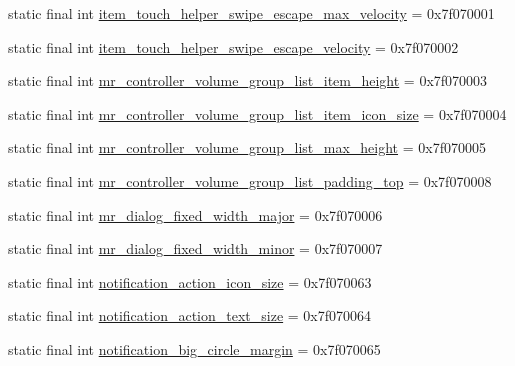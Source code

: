 \begin{CompactItemize}
\item 
static final int \hyperlink{classandroid_1_1support_1_1graphics_1_1drawable_1_1_r_1_1dimen_fcfa127e66b2338009ea298277b85d69}{item\_\-touch\_\-helper\_\-swipe\_\-escape\_\-max\_\-velocity} = 0x7f070001
\item 
static final int \hyperlink{classandroid_1_1support_1_1graphics_1_1drawable_1_1_r_1_1dimen_8df428d4057f24f87acdb506428de57d}{item\_\-touch\_\-helper\_\-swipe\_\-escape\_\-velocity} = 0x7f070002
\item 
static final int \hyperlink{classandroid_1_1support_1_1graphics_1_1drawable_1_1_r_1_1dimen_66c35ff22e7f7a9de2da63670c5d3574}{mr\_\-controller\_\-volume\_\-group\_\-list\_\-item\_\-height} = 0x7f070003
\item 
static final int \hyperlink{classandroid_1_1support_1_1graphics_1_1drawable_1_1_r_1_1dimen_02ea36fce0a33125712616ed9b9ff443}{mr\_\-controller\_\-volume\_\-group\_\-list\_\-item\_\-icon\_\-size} = 0x7f070004
\item 
static final int \hyperlink{classandroid_1_1support_1_1graphics_1_1drawable_1_1_r_1_1dimen_12d2f72214090aa9f222cbcc1084db9b}{mr\_\-controller\_\-volume\_\-group\_\-list\_\-max\_\-height} = 0x7f070005
\item 
static final int \hyperlink{classandroid_1_1support_1_1graphics_1_1drawable_1_1_r_1_1dimen_6f17005e849b0d17a1cd0939a5a1381a}{mr\_\-controller\_\-volume\_\-group\_\-list\_\-padding\_\-top} = 0x7f070008
\item 
static final int \hyperlink{classandroid_1_1support_1_1graphics_1_1drawable_1_1_r_1_1dimen_d2a05eddbf49cfef8ddbaa0c21bf5bf9}{mr\_\-dialog\_\-fixed\_\-width\_\-major} = 0x7f070006
\item 
static final int \hyperlink{classandroid_1_1support_1_1graphics_1_1drawable_1_1_r_1_1dimen_2545953f0a8fdde62a97aec23cbe4575}{mr\_\-dialog\_\-fixed\_\-width\_\-minor} = 0x7f070007
\item 
static final int \hyperlink{classandroid_1_1support_1_1graphics_1_1drawable_1_1_r_1_1dimen_836ec3cb76cacb9bbb315ea5fac69f86}{notification\_\-action\_\-icon\_\-size} = 0x7f070063
\item 
static final int \hyperlink{classandroid_1_1support_1_1graphics_1_1drawable_1_1_r_1_1dimen_e6f6683398a9c09eec4135570fe91bf5}{notification\_\-action\_\-text\_\-size} = 0x7f070064
\item 
static final int \hyperlink{classandroid_1_1support_1_1graphics_1_1drawable_1_1_r_1_1dimen_1d4bf3ebda5a48eeaf32c0b060a1249b}{notification\_\-big\_\-circle\_\-margin} = 0x7f070065

\end{CompactItemize}
